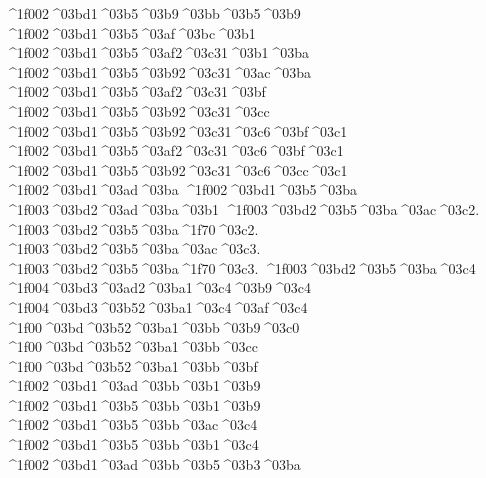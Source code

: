 {^^^^1f002^^^^03bd1^^^^03b5^^^^03b9^^^^03bb^^^^03b5^^^^03b9
^^^^1f002^^^^03bd1^^^^03b5^^^^03af^^^^03bc^^^^03b1 		%
^^^^1f002^^^^03bd1^^^^03b5^^^^03af2^^^^03c31^^^^03b1^^^^03ba  		%
^^^^1f002^^^^03bd1^^^^03b5^^^^03b92^^^^03c31^^^^03ac^^^^03ba
^^^^1f002^^^^03bd1^^^^03b5^^^^03af2^^^^03c31^^^^03bf  		%
^^^^1f002^^^^03bd1^^^^03b5^^^^03b92^^^^03c31^^^^03cc
^^^^1f002^^^^03bd1^^^^03b5^^^^03b92^^^^03c31^^^^03c6^^^^03bf^^^^03c1 		%
^^^^1f002^^^^03bd1^^^^03b5^^^^03af2^^^^03c31^^^^03c6^^^^03bf^^^^03c1 		%
^^^^1f002^^^^03bd1^^^^03b5^^^^03b92^^^^03c31^^^^03c6^^^^03cc^^^^03c1
^^^^1f002^^^^03bd1^^^^03ad^^^^03ba   		%
^^^^1f002^^^^03bd1^^^^03b5^^^^03ba
	^^^^1f003^^^^03bd2^^^^03ad^^^^03ba^^^^03b1 		%
	^^^^1f003^^^^03bd2^^^^03b5^^^^03ba^^^^03ac^^^^03c2. 		%
	^^^^1f003^^^^03bd2^^^^03b5^^^^03ba^^^^1f70^^^^03c2.
	^^^^1f003^^^^03bd2^^^^03b5^^^^03ba^^^^03ac^^^^03c3.
	^^^^1f003^^^^03bd2^^^^03b5^^^^03ba^^^^1f70^^^^03c3.
	^^^^1f003^^^^03bd2^^^^03b5^^^^03ba^^^^03c4 		%
		^^^^1f004^^^^03bd3^^^^03ad2^^^^03ba1^^^^03c4^^^^03b9^^^^03c4		%
		^^^^1f004^^^^03bd3^^^^03b52^^^^03ba1^^^^03c4^^^^03af^^^^03c4
^^^^1f00^^^^03bd^^^^03b52^^^^03ba1^^^^03bb^^^^03b9^^^^03c0 		%
^^^^1f00^^^^03bd^^^^03b52^^^^03ba1^^^^03bb^^^^03cc		%
^^^^1f00^^^^03bd^^^^03b52^^^^03ba1^^^^03bb^^^^03bf
^^^^1f002^^^^03bd1^^^^03ad^^^^03bb^^^^03b1^^^^03b9   		%
^^^^1f002^^^^03bd1^^^^03b5^^^^03bb^^^^03b1^^^^03b9
^^^^1f002^^^^03bd1^^^^03b5^^^^03bb^^^^03ac^^^^03c4		%
^^^^1f002^^^^03bd1^^^^03b5^^^^03bb^^^^03b1^^^^03c4
^^^^1f002^^^^03bd1^^^^03ad^^^^03bb^^^^03b5^^^^03b3^^^^03ba		%
}
